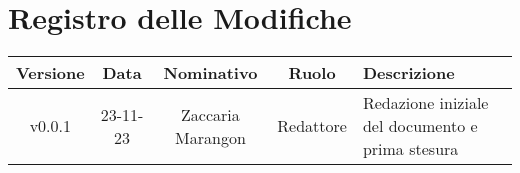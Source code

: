 \section*{\Large Registro delle Modifiche}
    \begin{table}[h]
        \centering
        \renewcommand\tabularxcolumn[1]{m{#1}} %
        \renewcommand{\arraystretch}{1.5}
        \begin{tabularx}{0.98\textwidth}
            {c|c|c|c|>{\centering\arraybackslash}X}
            \rowcolor{black}
            \textbf{\color{white} Versione} & \textbf{\color{white} Data} & \textbf{\color{white} Nominativo} & \textbf{\color{white} Ruolo} & \textbf{\color{white} Descrizione} \\ 
            \hline

            v0.0.1 & 23-11-23 & Zaccaria Marangon & Redattore & Redazione iniziale del documento e prima stesura \\
            \hline
        \end{tabularx}
    \end{table}